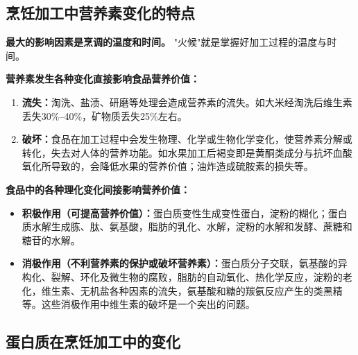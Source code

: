 \subsection{烹饪加工中营养素变化的特点}

\begin{tipbox}
\textbf{最大的影响因素是烹调的温度和时间。}%
"火候"就是掌握好加工过程的温度与时间。

\textbf{营养素发生各种变化直接影响食品营养价值：}
\begin{enumerate}[leftmargin=*]
    \item \textbf{流失：}淘洗、盐渍、研磨等处理会造成营养素的流失。如大米经淘洗后维生素丢失30\%--40\%，矿物质丢失25\%左右。
    \item \textbf{破坏：}食品在加工过程中会发生物理、化学或生物化学变化，使营养素分解或转化，失去对人体的营养功能。如水果加工后褐变即是黄酮类成分与抗坏血酸氧化所导致的，会降低水果的营养价值；油炸造成硫胺素的损失等。
\end{enumerate}

\textbf{食品中的各种理化变化间接影响营养价值：}
\begin{itemize}[leftmargin=*]
    \item \textbf{积极作用（可提高营养价值）：}蛋白质变性生成变性蛋白，淀粉的糊化；蛋白质水解生成胨、肽、氨基酸，脂肪的乳化、水解，淀粉的水解和发酵、蔗糖和糖苷的水解。
    \item \textbf{消极作用（不利营养素的保护或破坏营养素）：}蛋白质分子交联，氨基酸的异构化、裂解、环化及微生物的腐败，脂肪的自动氧化、热化学反应，淀粉的老化，维生素、无机盐各种因素的流失，氨基酸和糖的羰氨反应产生的类黑精等。这些消极作用中维生素的破坏是一个突出的问题。
\end{itemize}
\end{tipbox}

\subsection{蛋白质在烹饪加工中的变化}

